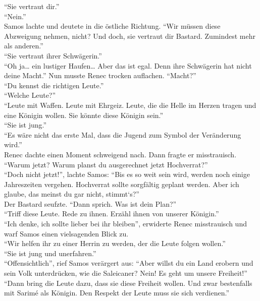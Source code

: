 ``Sie vertraut dir.''\\
``Nein.''\\
Samos lachte und deutete in die östliche Richtung. ``Wir müssen diese Abzweigung nehmen, nicht? Und 
doch, sie vertraut dir Bastard. Zumindest mehr als anderen.''\\
``Sie vertraut ihrer Schwägerin.''\\
``Oh ja… ein lustiger Haufen… Aber das ist egal. Denn ihre Schwägerin hat nicht deine Macht.''
Nun musste Renec trocken auflachen. ``Macht?''\\
``Du kennst die richtigen Leute.''\\
``Welche Leute?''\\
``Leute mit Waffen. Leute mit Ehrgeiz. Leute, die die Helle im Herzen tragen und eine Königin 
wollen. Sie könnte diese Königin sein.''\\
``Sie ist jung.''\\
``Es wäre nicht das erste Mal, dass die Jugend zum Symbol der Veränderung wird.''\\
Renec dachte einen Moment schweigend nach. Dann fragte er misstrauisch. ``Warum jetzt? Warum planst 
du ausgerechnet jetzt Hochverrat?''\\
``Doch nicht jetzt!'', lachte Samos: ``Bis es so weit sein wird, werden noch einige Jahreszeiten 
vergehen. Hochverrat sollte sorgfältig geplant werden. Aber ich glaube, das meinst du gar nicht, 
stimmt‘s?''\\
Der Bastard seufzte. ``Dann sprich. Was ist dein Plan?''\\
``Triff diese Leute. Rede zu ihnen. Erzähl ihnen von unserer Königin.''\\
``Ich denke, ich sollte lieber bei ihr bleiben'', erwiderte Renec misstrauisch und warf Samos einen 
vielsagenden Blick zu.\\
``Wir helfen ihr zu einer Herrin zu werden, der die Leute folgen wollen.''\\
``Sie ist jung und unerfahren.''\\
``Offensichtlich'', rief Samos verärgert aus: ``Aber willst du ein Land erobern und sein Volk 
unterdrücken, wie die Saleicaner? Nein! Es geht um unsere Freiheit!''\\
``Dann bring die Leute dazu, dass sie diese Freiheit wollen. Und zwar bestenfalls mit Sarimé als 
Königin. Den Respekt der Leute muss sie sich verdienen.''\\



